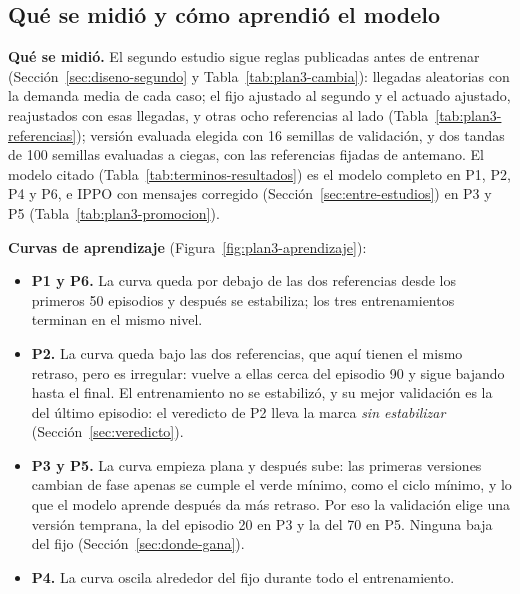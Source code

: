 \subsection{Qué se midió y cómo aprendió el modelo}
\label{sec:segundo-procedimiento}
\noindent\textbf{Qué se midió.} El segundo estudio sigue reglas
publicadas antes de entrenar (Sección~\ref{sec:diseno-segundo} y
Tabla~\ref{tab:plan3-cambia}): llegadas aleatorias con la demanda media
de cada caso; el fijo ajustado al segundo y el actuado ajustado,
reajustados con esas llegadas, y otras ocho referencias al lado
(Tabla~\ref{tab:plan3-referencias}); versión evaluada elegida con 16
semillas de validación, y dos tandas de 100 semillas evaluadas a ciegas,
con las referencias fijadas de antemano. El modelo
citado (Tabla~\ref{tab:terminos-resultados}) es el modelo completo en
P1, P2, P4 y P6, e IPPO con mensajes corregido
(Sección~\ref{sec:entre-estudios}) en P3 y P5
(Tabla~\ref{tab:plan3-promocion}).

\noindent\textbf{Curvas de aprendizaje}
(Figura~\ref{fig:plan3-aprendizaje}):
\begin{itemize}
  \item \textbf{P1 y P6.} La curva queda por debajo de las dos
    referencias desde los primeros 50 episodios y después se estabiliza;
    los tres entrenamientos terminan en el mismo nivel.
  \item \textbf{P2.} La curva queda bajo las dos referencias, que aquí
    tienen el mismo retraso, pero es irregular: vuelve a ellas cerca del
    episodio 90 y sigue bajando hasta el final. El entrenamiento no se
    estabilizó, y su mejor validación es la del último episodio: el
    veredicto de P2 lleva la marca \emph{sin estabilizar}
    (Sección~\ref{sec:veredicto}).
  \item \textbf{P3 y P5.} La curva empieza plana y después sube: las
    primeras versiones cambian de fase apenas se cumple el verde mínimo,
    como el ciclo mínimo, y lo que el modelo aprende después da más
    retraso. Por eso la validación elige una versión temprana, la del
    episodio 20 en P3 y la del 70 en P5. Ninguna baja del fijo
    (Sección~\ref{sec:donde-gana}).
  \item \textbf{P4.} La curva oscila alrededor del fijo durante todo el
    entrenamiento.
\end{itemize}


